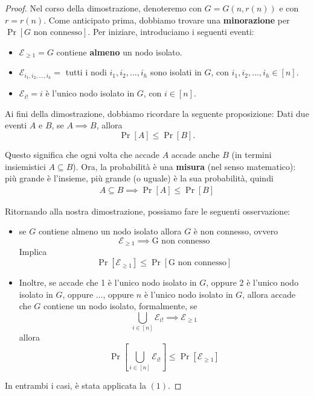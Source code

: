 \begin{proof}
    Nel corso della dimostrazione, denoteremo con $G = G(n, r(n))$ e con $r = r(n)$. Come anticipato prima, dobbiamo trovare una \textbf{minorazione} per $\Pr[G \text{ non connesso}]$. Per iniziare, introduciamo i seguenti eventi:
    \begin{itemize}
        \item $\mathcal{E}_{\geq 1} = G$ contiene \textbf{almeno} un nodo isolato.
        \item $\mathcal{E}_{i_1, i_2, \dots, i_h} = $ tutti i nodi $i_1, i_2, \dots, i_h$ sono isolati in $G$, con $i_1, i_2, \dots, i_h \in [n]$.
        \item $\mathcal{E}_{i!} = i$ è l'unico nodo isolato in $G$, con $i \in [n]$.
    \end{itemize}

 Ai fini della dimostrazione, dobbiamo ricordare la seguente proposizione: 
 Dati due eventi $A$ e $B$, se $A \implies B$, allora
\[
    \Pr[A] \leq \Pr[B].    
\]

 Questo significa che ogni volta che accade $A$ accade anche $B$ (in termini insiemistici $A \subseteq B$). 
Ora, la probabilità è una \textbf{misura} (nel senso matematico): più grande è l'insieme, più grande (o uguale) è la sua probabilità, quindi
\begin{align}
A \subseteq B \implies \Pr[A] \leq \Pr[B]
\end{align}

 Ritornando alla nostra dimostrazione, possiamo fare le seguenti osservazione:
\begin{itemize}
    \item {
        se $G$ contiene almeno un nodo isolato allora $G$ è non connesso, ovvero
        \[
        \mathcal{E}_{\geq 1} \implies \text{G non connesso}
        \]
        Implica
        \[
        \Pr[\mathcal{E}_{\geq 1}] \leq \Pr[\text{G non connesso}]
        \]
    }
    \item {
        Inoltre, se accade che 1 è l'unico nodo isolato in $G$, oppure 2 è l'unico nodo isolato in $G$, oppure $\dots$, oppure $n$ è l'unico nodo isolato in $G$, allora accade che $G$ contiene un nodo isolato, formalmente, se
        \[
        \bigcup_{i \in [n]} \mathcal{E}_{i!} \implies \mathcal{E}_{\geq1}
        \]
        allora
        \[
        \Pr\left[\bigcup_{i \in [n]} \mathcal{E}_{i!}\right] \leq \Pr[\mathcal{E}_{\geq1}]
        \]
    }
\end{itemize}

In entrambi i casi, è stata applicata la $(1)$.


\end{proof}

